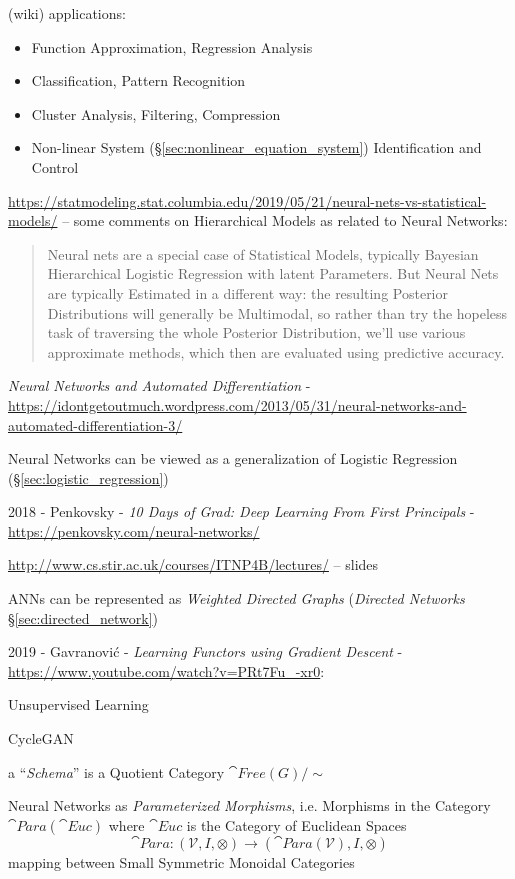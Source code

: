 (wiki) applications:
\begin{itemize}
  \item Function Approximation, Regression Analysis
  \item Classification, Pattern Recognition
  \item Cluster Analysis, Filtering, Compression
  \item Non-linear System (\S\ref{sec:nonlinear_equation_system})
    Identification and Control
\end{itemize}

\url{https://statmodeling.stat.columbia.edu/2019/05/21/neural-nets-vs-statistical-models/}
-- some comments on Hierarchical Models as related to Neural Networks:
\begin{quote}
  Neural nets are a special case of Statistical Models, typically Bayesian
  Hierarchical Logistic Regression with latent Parameters. But Neural Nets are
  typically Estimated in a different way: the resulting Posterior Distributions
  will generally be Multimodal, so rather than try the hopeless task of
  traversing the whole Posterior Distribution, we’ll use various approximate
  methods, which then are evaluated using predictive accuracy.
\end{quote}

\emph{Neural Networks and Automated Differentiation} -
\url{https://idontgetoutmuch.wordpress.com/2013/05/31/neural-networks-and-automated-differentiation-3/}

Neural Networks can be viewed as a generalization of Logistic Regression
(\S\ref{sec:logistic_regression})

2018 - Penkovsky - \emph{10 Days of Grad: Deep Learning From First Principals} -
\url{https://penkovsky.com/neural-networks/}

\asterism

\url{http://www.cs.stir.ac.uk/courses/ITNP4B/lectures/} -- slides

ANNs can be represented as \emph{Weighted Directed Graphs}
(\emph{Directed Networks} \S\ref{sec:directed_network})

\asterism

2019 - Gavranovi\'c - \emph{Learning Functors using Gradient Descent} -
\url{https://www.youtube.com/watch?v=PRt7Fu_-xr0}:

Unsupervised Learning

CycleGAN

a ``\emph{Schema}'' is a Quotient Category $\cat{Free}(G)/\sim$

Neural Networks as \emph{Parameterized Morphisms}, i.e. Morphisms in the
Category $\cat{Para}(\cat{Euc})$ where $\cat{Euc}$ is the Category of Euclidean
Spaces
\[
  \cat{Para} : (\mathcal{V}, I, \otimes)
    \to (\cat{Para}(\mathcal{V}), I, \otimes)
\]
mapping between Small Symmetric Monoidal Categories

